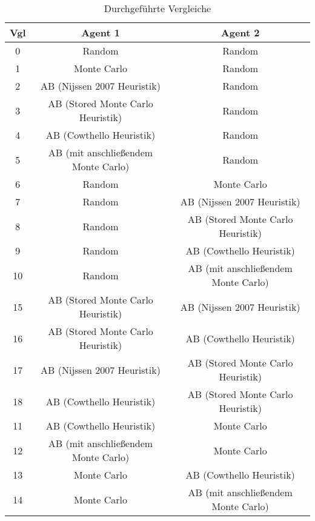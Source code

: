 \begin{table}[ht]
\begin{adjustbox}{max width=\textwidth}
\begin{tabular}{| c | c | c |} \hline
\ac{Vgl} & Agent 1 & Agent 2 \\ \hline
\hline
0  & Random                              & Random                              \\ \hline
\hline
 1 & Monte Carlo                         & Random                              \\ \hline
 2 & \ac{AB} (Nijssen 2007 Heuristik)         & Random                              \\ \hline
 3 & \ac{AB} (Stored Monte Carlo Heuristik)   & Random                              \\ \hline
 4 & \ac{AB} (Cowthello Heuristik)            & Random                              \\ \hline
 5 & \ac{AB} (mit anschließendem Monte Carlo) & Random                              \\ \hline
\hline
 6 & Random                              & Monte Carlo                         \\ \hline
 7 & Random                              & \ac{AB} (Nijssen 2007 Heuristik)         \\ \hline
 8 & Random                              & \ac{AB} (Stored Monte Carlo Heuristik)   \\ \hline
 9 & Random                              & \ac{AB} (Cowthello Heuristik)            \\ \hline
10 & Random                              & \ac{AB} (mit anschließendem Monte Carlo) \\ \hline
\hline
15 & \ac{AB} (Stored Monte Carlo Heuristik)   & \ac{AB} (Nijssen 2007 Heuristik)    \\ \hline
16 & \ac{AB} (Stored Monte Carlo Heuristik)   & \ac{AB} (Cowthello Heuristik)       \\ \hline
17 & \ac{AB} (Nijssen 2007 Heuristik)    & \ac{AB} (Stored Monte Carlo Heuristik)   \\ \hline
18 & \ac{AB} (Cowthello Heuristik)       & \ac{AB} (Stored Monte Carlo Heuristik)   \\ \hline
\hline
11 & \ac{AB} (Cowthello Heuristik)            & Monte Carlo                         \\ \hline
12 & \ac{AB} (mit anschließendem Monte Carlo) & Monte Carlo                         \\ \hline
13 & Monte Carlo                         & \ac{AB} (Cowthello Heuristik)            \\ \hline
14 & Monte Carlo                         & \ac{AB} (mit anschließendem Monte Carlo) \\ \hline
\end{tabular}
\end{adjustbox}
\caption{Durchgeführte Vergleiche}
\label{tbl:cmp-agents}
%
\end{table}

